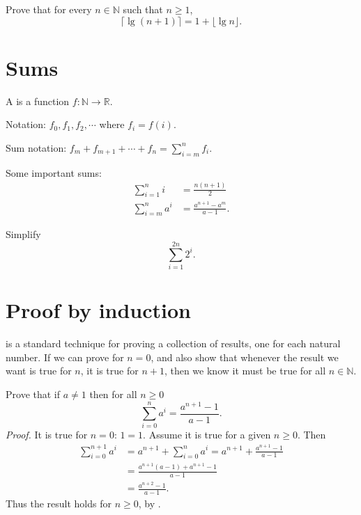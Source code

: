 \begin{Boxample}[4]
Prove that for every $n\in \mathbb{N}$ such that $n\geq 1$,
$$ \lceil \lg (n+1) \rceil = 1 + \lfloor \lg n \rfloor\text{.}$$
\end{Boxample}


\section{Sums}
A  is a function $f \colon \mathbb{N} \to \mathbb{R}$. 

Notation: $f_0, f_1, f_2, \cdots$ where $f_i = f(i)$.

Sum notation: $f_m+f_{m+1}+\cdots +f_n = \sum_{i=m}^n f_i$.

Some important sums: 
\begin{align*}
	\sum_{i=1}^n i & = \frac{n(n + 1)}{2} \\
	\sum_{i=m}^n a^i&  = \frac{a^{n+1} - a^m}{a - 1}.
\end{align*}

\begin{Boxample}[4]
Simplify $$\sum_{i=1}^{2n} 2^i\text{.}$$
\end{Boxample}


\section{Proof by induction}
 is a standard technique for proving a collection of results, one for each natural number. 
If we can prove for $n = 0$, and also show that whenever the result we want is true for $n$, it is true for $n+1$,
then we know it must be true for all $n \in \mathbb{N}$.

\begin{Boxample}
Prove that if $a\neq 1$ then for all  $n\geq 0$
$$
	\sum_{i=0}^n a^i = \frac{a^{n+1} - 1}{a - 1}.
$$
\textit{Proof.} It is true for $n=0$: $1 = 1$. Assume it is true for a given  $n\geq 0$. Then
\begin{align*}
\sum_{i=0}^{n+1} a^i 
	& = a^{n+1} + \sum_{i=0}^n a^i = a^{n+1} + \frac{a^{n+1} - 1}{a - 1} \\
	& = \frac{a^{n+1} (a - 1) + a^{n+1} - 1}{a - 1}\\
	& = \frac{a^{n+2} - 1}{a - 1}.
\end{align*}
Thus the result holds for  $n \geq 0$, by .
\end{Boxample}

